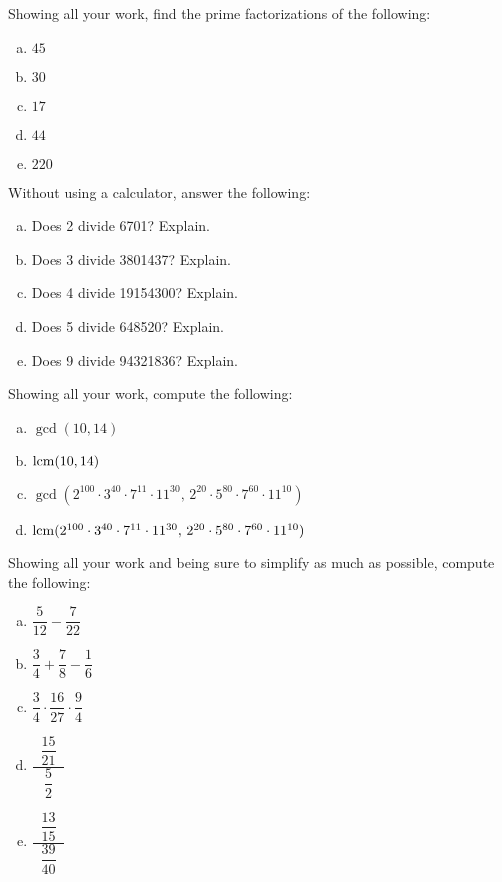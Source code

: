 \documentclass[11pt,letterpaper]{article}
\begin{document}

 Showing all your work, find the prime factorizations of the following:
	\begin{enumerate}[(a)]
	\item $45$
	\item $30$
	\item $17$
	\item $44$
	\item $220$
	\end{enumerate}



\newpage



 Without using a calculator, answer the following:
	\begin{enumerate}[(a)]
	\item Does 2 divide 6701? Explain.
	\item Does 3 divide 3801437? Explain.
	\item Does 4 divide 19154300? Explain.
	\item Does 5 divide 648520? Explain.
	\item Does 9 divide 94321836? Explain. 
	\end{enumerate}



\newpage



 Showing all your work, compute the following:
	\begin{enumerate}[(a)]
	\item $\gcd(10, 14)$
	\item $\operatorname{lcm}(10, 14)$
	\item $\gcd(2^{100} \cdot 3^{40} \cdot 7^{11} \cdot 11^{30},\, 2^{20} \cdot 5^{80} \cdot 7^{60} \cdot 11^{10})$
	\item $\operatorname{lcm}(2^{100} \cdot 3^{40} \cdot 7^{11} \cdot 11^{30},\, 2^{20} \cdot 5^{80} \cdot 7^{60} \cdot 11^{10})$
	\end{enumerate} 



\newpage



 Showing all your work and being sure to simplify as much as possible, compute the following:
	\begin{enumerate}[(a)]
	\item $\dfrac{5}{12} - \dfrac{7}{22}$
	\item $\dfrac{3}{4} + \dfrac{7}{8} - \dfrac{1}{6}$
	\item $\dfrac{3}{4} \cdot \dfrac{16}{27} \cdot \dfrac{9}{4}$
	\item $\dfrac{\;\;\dfrac{15}{21}\;\;}{\;\;\dfrac{5}{2}\;\;}$
	\item $\dfrac{\;\;\dfrac{13}{15}\;\;}{\;\;\dfrac{39}{40}\;\;}$
	\end{enumerate}
\end{document}
